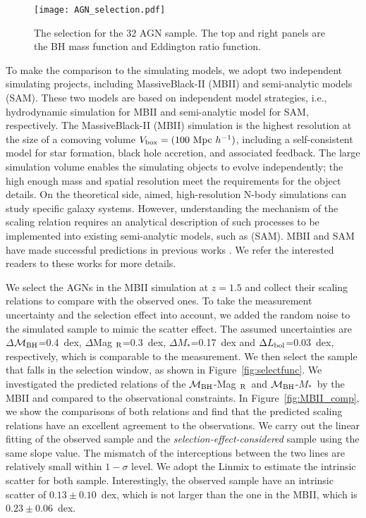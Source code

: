 \documentclass{natureprintstyle}
\newcommand{\mbh}{$\mathcal M_{\rm BH}$}
\newcommand{\mr}{Mag$_{\rm ~R}$}
\newcommand{\mstar}{{$M_*$}}
\begin{document}
\begin{figure}[t]
\texttt{[image: AGN\_selection.pdf]}
\caption{The selection for the 32 AGN sample. The top and right panels are the BH mass function and Eddington ratio function.
}
\label{fig:AGN_select}
\end{figure}

To make the comparison to the simulating models, we adopt two independent simulating projects, including MassiveBlack-II (MBII) and semi-analytic models (SAM). These two models are based on independent model strategies, i.e., hydrodynamic simulation for MBII and semi-analytic model for SAM, respectively. The MassiveBlack-II (MBII) simulation is the highest resolution at the size of a comoving volume $V_{\rm box} = (100~{\rm Mpc}~h^{-1})$, including a self-consistent model for star formation, black hole accretion, and associated feedback. The large simulation volume enables the simulating objects to evolve independently; the high enough mass and spatial resolution meet the requirements for the object details. On the theoretical side, aimed, high-resolution N-body simulations can study specific galaxy systems. However, understanding the mechanism of the scaling relation requires an analytical description of such processes to be implemented into existing semi-analytic models, such as (SAM). 
MBII and SAM have made successful predictions in previous works \cite{Menci2014, Menci2016, Khandai2015}. We refer the interested readers to these works for more details.

We select the AGNs in the MBII simulation at $z=1.5$ and collect their scaling relations to compare with the observed ones. To take the measurement uncertainty and the selection effect into account, we added the random noise to the simulated sample to mimic the scatter effect. The assumed uncertainties are $\Delta$\mbh =0.4~dex, $\Delta$\mr=0.3~dex, $\Delta$\mstar=0.17~dex and $\Delta L_{\rm bol}$=0.03~dex, respectively, which is comparable to the measurement. We then select the sample that falls in the selection window, as shown in Figure~\ref{fig:selectfunc}. We investigated the predicted relations of the \mbh-\mr\ and \mbh-\mstar\ by the MBII and compared to the observational constraints. In Figure~\ref{fig:MBII_comp}, we show the comparisons of both relations and find that the predicted scaling relations have an excellent agreement to the observations. We carry out the linear fitting of the observed sample and the {\it selection-effect-considered} sample using the same slope value. The mismatch of the interceptions between the two lines are relatively small within $1-\sigma$ level. We adopt the {\sc Linmix} to estimate the intrinsic scatter for both sample. Interestingly, the observed sample have an intrinsic scatter of $0.13\pm0.10$~dex, which is not larger than the one in the MBII, which is $0.23\pm0.06$~dex.
\end{document}
